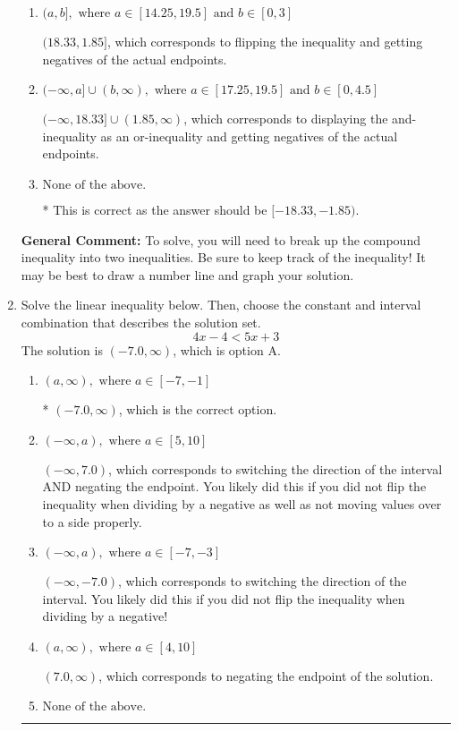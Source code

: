 \documentclass{extbook}[14pt]
\newcommand{\litem}[1]{\item #1

\rule{\textwidth}{0.4pt}}
\begin{document}
\begin{enumerate}
{\begin{enumerate}[label=\Alph*.]
$(-\infty, 18.33) \cup [1.85, \infty)$, which corresponds to displaying the and-inequality as an or-inequality AND flipping the inequality AND getting negatives of the actual endpoints.
\item \( (a, b], \text{ where } a \in [14.25, 19.5] \text{ and } b \in [0, 3] \)

$(18.33, 1.85]$, which corresponds to flipping the inequality and getting negatives of the actual endpoints.
\item \( (-\infty, a] \cup (b, \infty), \text{ where } a \in [17.25, 19.5] \text{ and } b \in [0, 4.5] \)

$(-\infty, 18.33] \cup (1.85, \infty)$, which corresponds to displaying the and-inequality as an or-inequality and getting negatives of the actual endpoints.
\item \( \text{None of the above.} \)

* This is correct as the answer should be $[-18.33, -1.85)$.
\end{enumerate}

\textbf{General Comment:} To solve, you will need to break up the compound inequality into two inequalities. Be sure to keep track of the inequality! It may be best to draw a number line and graph your solution.
}
\litem{
Solve the linear inequality below. Then, choose the constant and interval combination that describes the solution set.
\[ 4x -4 < 5x + 3 \]The solution is \( (-7.0, \infty) \), which is option A.\begin{enumerate}[label=\Alph*.]
\item \( (a, \infty), \text{ where } a \in [-7, -1] \)

* $(-7.0, \infty)$, which is the correct option.
\item \( (-\infty, a), \text{ where } a \in [5, 10] \)

 $(-\infty, 7.0)$, which corresponds to switching the direction of the interval AND negating the endpoint. You likely did this if you did not flip the inequality when dividing by a negative as well as not moving values over to a side properly.
\item \( (-\infty, a), \text{ where } a \in [-7, -3] \)

 $(-\infty, -7.0)$, which corresponds to switching the direction of the interval. You likely did this if you did not flip the inequality when dividing by a negative!
\item \( (a, \infty), \text{ where } a \in [4, 10] \)

 $(7.0, \infty)$, which corresponds to negating the endpoint of the solution.
\item \( \text{None of the above}. \)


\end{enumerate}}
\end{enumerate}
\end{document}
